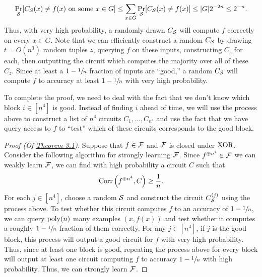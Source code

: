 \documentclass[11pt]{article}
\begin{document}
\begin{equation*}
    \Pr_{\mathcal{S}}[C_{\mathcal{S}}(x) \neq f(x) \text{ on some } x \in G] \leq \sum_{x \in G} \Pr_{\mathcal{S}}[C_{\mathcal{S}}(x) \neq f(x)] \leq |G|2^{-2n} \leq 2^{-n}.
\end{equation*}
Thus, with very high probability, a randomly drawn $C_{\mathcal{S}}$ will compute $f$ correctly on every $x \in G$. Note that we can efficiently construct a random $C_{\mathcal{S}}$ by drawing $t = O(n^3)$ random tuples $z$, querying $f$ on these inputs, constructing $C_z$ for each, then outputting the circuit which computes the majority over all of these $C_z$. Since at least a $1 - \sfrac{1}{n}$ fraction of inputs are ``good,'' a random $C_{\mathcal{S}}$ will compute $f$ to accuracy at least $1 - \sfrac{1}{n}$ with very high probability. 

To complete the proof, we need to deal with the fact that we don't know which block $i \in [n^4]$ is good. Instead of finding $i$ ahead of time, we will use the process above to construct a list of $n^4$ circuits $C_1, \ldots, C_{n^4}$ and use the fact that we have query access to $f$ to ``test'' which of these circuits corresponds to the good block.

\begin{proof}[Proof \textup{(Of \hyperref[t-3-1]{Theorem 3.1})}]
    Suppose that $f \in \mathcal{F}$ and $\mathcal{F}$ is closed under $\textup{XOR}{}$. Consider the following algorithm for strongly learning $\mathcal{F}$. Since $f^{\oplus n^4} \in \mathcal{F}$ we can weakly learn $\mathcal{F}$, we can find with high probability a circuit $C$ such that 
    \begin{equation*}
        \mathrm{Corr}\left(f^{\oplus n^4}, C\right) \geq \frac{1}{n}.
    \end{equation*}
    For each $j \in [n^4]$, choose a random $\mathcal{S}$ and construct the circuit $C_{\mathcal{S}}^{(j)}$ using the process above. To test whether this circuit computes $f$ to an accuracy of $1 - \sfrac{1}{n}$, we can query $\mathrm{poly}(n)$ many examples $(x, f(x))$ and test whether it computes a roughly $1 - \sfrac{1}{n}$ fraction of them correctly. For any $j \in [n^4]$, if $j$ is the good block, this process will output a good circuit for $f$ with very high probability. Thus, since at least one block is good, repeating the process above for every block will output at least one circuit computing $f$ to accuracy $1 - \sfrac{1}{n}$ with high probability. Thus, we can strongly learn $\mathcal{F}$.
\end{proof}
\end{document}
